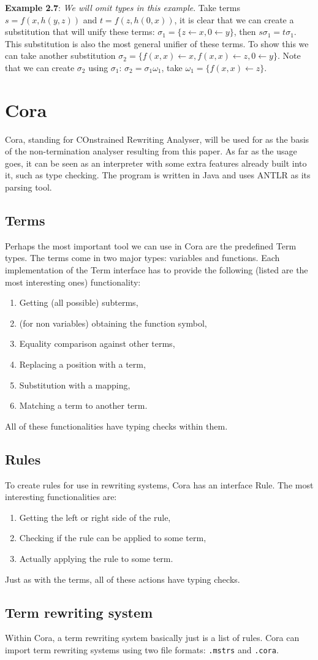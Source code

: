 \textbf{Example 2.7}: \textit{We will omit types in this example}. Take terms $s = f(x, h(y, z))$ and $t = f(z, h(0, x))$, it is clear that we can create a substitution that will unify these terms: $\sigma_1 = \{ z \leftarrow x, 0 \leftarrow y \}$, then $s\sigma_1 = t\sigma_1$. This substitution is also the most general unifier of these terms. To show this we can take another substitution $\sigma_2 = \{ f(x, x) \leftarrow x, f(x, x) \leftarrow z, 0 \leftarrow y \}$. Note that we can create $\sigma_2$ using $\sigma_1$: $\sigma_2 = \sigma_1\omega_1$, take $\omega_1 = \{ f(x, x) \leftarrow z\}$.

\section{Cora}
Cora, standing for COnstrained Rewriting Analyser\cite{Cora2019}, will be used for as the basis of the non-termination analyser resulting from this paper. As far as the usage goes, it can be seen as an interpreter with some extra features already built into it, such as type checking. The program is written in Java and uses ANTLR\cite{Parr:2013:DAR:2501720} as its parsing tool.

\subsection{Terms}
Perhaps the most important tool we can use in Cora are the predefined Term types. The terms come in two major types: variables and functions. Each implementation of the Term interface has to provide the following (listed are the most interesting ones) functionality: 
\begin{enumerate}
    \itemsep0em 
    \item Getting (all possible) subterms,
    \item (for non variables) obtaining the function symbol,
    \item Equality comparison against other terms,
    \item Replacing a position with a term,
    \item Substitution with a mapping,
    \item Matching a term to another term.
\end{enumerate}
All of these functionalities have typing checks within them. 
\subsection{Rules}
To create rules for use in rewriting systems, Cora has an interface Rule. The most interesting functionalities are: 
\begin{enumerate}
    \itemsep0em
    \item Getting the left or right side of the rule,
    \item Checking if the rule can be applied to some term,
    \item Actually applying the rule to some term.
\end{enumerate}
Just as with the terms, all of these actions have typing checks. 
\subsection{Term rewriting system}
Within Cora, a term rewriting system basically just is a list of rules. Cora can import term rewriting systems using two file formats: \texttt{.mstrs} and \texttt{.cora}. 